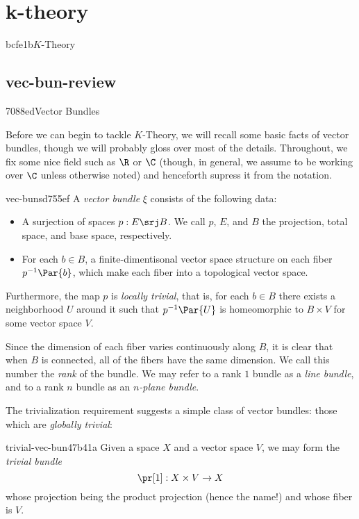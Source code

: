 \makeatletter{}\makeatother

\chapter{k-theory}{bcfe1b}{$K$-Theory}

\section{vec-bun-review}{7088ed}{Vector Bundles}

Before we can begin to tackle $K$-Theory, we will recall some basic facts
of vector bundles, though we will probably gloss over most of the details.
Throughout, we fix some nice field such as $\R$ or $\C$ (though, in general,
we assume to be working over $\C$ unless otherwise noted) and henceforth
supress it from the notation.

\begin{defn}{vec-buns}{d755ef}
  A \emph{vector bundle} $\xi$ consists of the following data:
  \begin{itemize}
    \item A surjection of spaces $p: E \srj B$. We call $p$, $E$, and $B$ the
          projection, total space, and base space, respectively.
    \item For each $b\in B$, a finite-dimentisonal vector space structure 
          on each fiber $p^{-1}\Par{b}$, which make each fiber into a 
          topological vector space.
  \end{itemize}  
  Furthermore, the map $p$ is \emph{locally trivial}, that is, for each 
  $b\in B$ there exists a neighborhood $U$ around it such that $p^{-1}\Par{U}$
  is homeomorphic to $B \times V$ for some vector space $V$.
\end{defn}

Since the dimension of each fiber varies continuously along $B$, it is clear that when $B$
is connected, all of the fibers have the same dimension. We call this number the \emph{rank}
of the bundle. We may refer to a rank $1$ bundle as a \emph{line bundle}, and to a rank $n$
bundle as an \emph{$n$-plane bundle}. 

The trivialization requirement suggests a simple class of vector bundles: those which
are \emph{globally trivial}:
\begin{exmp}{trivial-vec-bun}{47b41a}
  Given a space $X$ and a vector space $V$, we may form the \emph{trivial bundle}
  \[ \pr[1]: X \times V \to X \]
  whose projection being the product projection (hence the name!) and whose fiber is $V$. 
\end{exmp}


